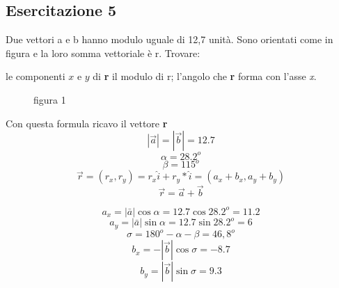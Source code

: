 \documentclass{book}
\begin{document}
\subsection{Esercitazione 5}
Due vettori a e b hanno modulo uguale di 12,7 unità. Sono orientati come in
figura e la loro somma vettoriale è r. Trovare:
\begin{tasks}
	\task le componenti $x$ e $y$ di \textbf{r}
	\task il modulo di r;
	\task l'angolo che \textbf{r} forma con l'asse \textit{x}.
\end{tasks}
\begin{figure}[!ht]
	\centering
	\caption{figura 1}
\end{figure}
\begin{multicols}{2}
	Con questa formula ricavo il vettore \textbf{r}
	\begin{equation*}
		|\overrightarrow{a}|=|\overrightarrow{b}|=12.7
	\end{equation*}
	\begin{equation*}
		\alpha=28.2^o
	\end{equation*}
	\begin{equation*}
		\beta=115^o
	\end{equation*}
	\begin{equation*}
		\overrightarrow{r}=(r_x,r_y)=r_x \hat{i}+r_y*\hat{i}=(a_x+b_x, a_y+b_y)
	\end{equation*}
	\begin{equation*}
		\overrightarrow{r}=\overrightarrow{a}+\overrightarrow{b}
	\end{equation*}
\end{multicols}
\begin{multicols}{2}
	\begin{equation*}
		a_x=|\bar{a}|\cos \alpha=12.7\cos 28.2^o=11.2
	\end{equation*}
	\begin{equation*}
		a_y=|\bar{a}|\sin \alpha=12.7\sin 28.2^o=6
	\end{equation*}
	\begin{equation*}
		\sigma=180^o-\alpha-\beta=46,8^o
	\end{equation*}
	\begin{equation*}
		b_x=-|\overrightarrow{b}|\cos \sigma=-8.7
	\end{equation*}
	\begin{equation*}
		b_y=|\overrightarrow{b}|\sin \sigma=9.3
	\end{equation*}
\end{multicols}
\end{document}
